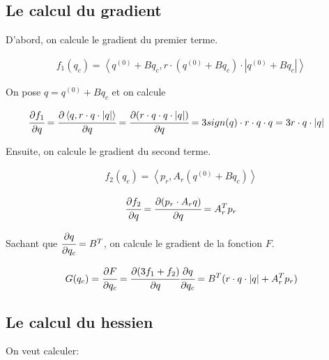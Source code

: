 \subsection{Le calcul du gradient}

D'abord, on calcule le gradient du premier terme.

\vspace{-1.5em}
\begin{align}
  f_1 (q_c) = \left \langle q^{(0)} + B q_c, r \cdot (q^{(0)} + B q_c) \cdot |q^{(0)} + B q_c| \right \rangle
\end{align}

On pose $q = q^{(0)} + B q_c$ et on calcule

\vspace{-1.5em}
\begin{align}
  \cfrac{\partial f_1}{\partial q} &= \cfrac{\partial  \left \langle q, r \cdot q \cdot |q| \right \rangle}{\partial q} = \cfrac{\partial(r \cdot q \cdot q \cdot |q|)}{\partial q} = 3sign(q) \cdot r \cdot q \cdot q = 3r \cdot q \cdot |q|
\end{align}

Ensuite, on calcule le gradient du second terme.

\vspace{-1.5em}
\begin{align}
  f_2 (q_c) = \left \langle p_r, A_r (q^{(0)} + B q_c) \right \rangle
\end{align}

\vspace{-1.5em}
\begin{align}
  \cfrac{\partial f_2}{\partial q} = \cfrac{\partial (p_r \cdot A_r q)}{\partial q} = A_r^T p_r
\end{align}

Sachant que $\cfrac{\partial q}{\partial q_c} = B^T$, on calcule le gradient de la fonction $F$.

\vspace{-1.5em}
\begin{align}
  G(q_c) = \cfrac{\partial F}{\partial q_c} = \cfrac{\partial (3f_1 + f_2)}{\partial q} \cfrac{\partial q}{\partial q_c} = B^T (r \cdot q \cdot |q| + A_r^T p_r)
\end{align}

\subsection{Le calcul du hessien}

On veut calculer:

